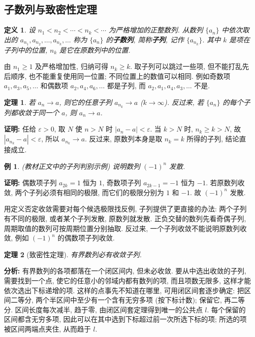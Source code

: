 \documentclass[UTF8,openany]{ctexbook}
\theoremstyle{chinesetextbook}
\newtheorem{definition}{定义}[section]
\newtheorem{example}{例}[section]
\newtheorem{theorem}{定理}[section]
\newenvironment{cnproof}{\par\indent\textbf{证明:} \ignorespaces}{\par}
\begin{document}
\subsection{子数列与致密性定理}
\begin{definition}
设 $n_1<n_2<\cdots<n_k<\cdots$ 为严格增加的正整数列. 从数列 $\{a_n\}$ 中依次取出的 $a_{n_1},a_{n_2},\ldots,a_{n_k},\ldots$ 称为 $\{a_n\}$ 的\textbf{子数列}, 简称\textbf{子列}, 记作 $\{a_{n_k}\}$. 其中 $k$ 是项在子列中的位置, $n_k$ 是它在原数列中的位置.
\end{definition}
由 $n_1\ge1$ 及严格增加性, 归纳可得 $n_k\ge k$. 取子列可以跳过一些项, 但不能打乱先后顺序, 也不能重复使用同一位置; 不同位置上的数值可以相同. 例如奇数项 $a_1,a_3,a_5,\ldots$ 和偶数项 $a_2,a_4,a_6,\ldots$ 都是子列, 而 $a_2,a_1,a_4,a_3,\ldots$ 不是.
\begin{theorem}
若 $a_n\to a$, 则它的任意子列 $a_{n_k}\to a$ ($k\to\infty$). 反过来, 若 $\{a_n\}$ 的每个子列都收敛于同一个 $a$, 则 $a_n\to a$.
\end{theorem}
\begin{cnproof}
任给 $\varepsilon>0$, 取 $N$ 使 $n>N$ 时 $|a_n-a|<\varepsilon$. 当 $k>N$ 时, $n_k\ge k>N$, 故 $|a_{n_k}-a|<\varepsilon$, 所以 $a_{n_k}\to a$. 反过来, 原数列本身是取 $n_k=k$ 所得的子列, 结论直接成立.
\end{cnproof}
\begin{example}
\textnormal{(教材正文中的子列判别示例)} 说明数列 $(-1)^n$ 发散.
\end{example}
\begin{cnproof}
偶数项子列 $a_{2k}=1$ 恒为 $1$, 奇数项子列 $a_{2k-1}=-1$ 恒为 $-1$. 若原数列收敛, 两个子列必须有相同的极限, 而它们的极限分别为 $1$ 和 $-1$. 故 $(-1)^n$ 发散.
\end{cnproof}
用定义否定收敛需要对每个候选极限找反例, 子列提供了更直接的办法: 两个子列有不同的极限, 或者某个子列发散, 原数列就发散. 正负交替的数列先看奇偶子列, 周期取值的数列可按周期位置分别抽取. 反过来, 一个子列收敛不能说明原数列收敛, 例如 $(-1)^n$ 的偶数项子列收敛.
\begin{theorem}[致密性定理]
有界数列必有收敛子列.
\end{theorem}
\par\indent\textbf{分析:} 有界数列的各项都落在一个闭区间内, 但未必收敛. 要从中选出收敛的子列, 需要找到一个点, 使它的任意小的邻域内都有数列的项, 而且项数无限多, 这样才能依次选出下标递增的项. 这样的点事先不知道在哪里, 可用闭区间套逐步确定: 把区间二等分, 两个半区间中至少有一个含有无穷多项 (按下标计数); 保留它, 再二等分. 区间长度每次减半, 趋于零, 由闭区间套定理得到唯一的公共点 $l$. 每个保留的区间都含无穷多项, 因此可以在其中选到下标超过前一次所选下标的项; 所选的项被区间两端点夹住, 从而趋于 $l$.
\end{document}

